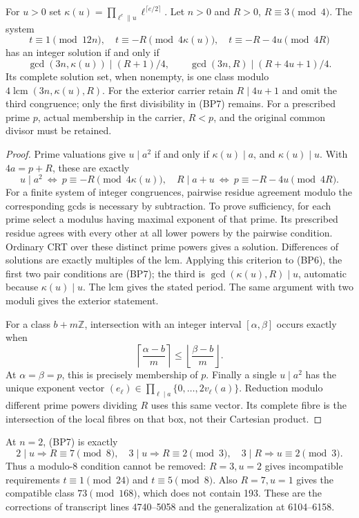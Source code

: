 \begin{theorem}
\label{thm:bp-crt}
For \(u>0\) set
\(\kappa(u)=\prod_{\ell^e\parallel u}\ell^{\lceil e/2\rceil}\).
Let \(n>0\) and \(R>0\), \(R\equiv3\pmod4\). The system
\[
 t\equiv1\pmod{12n},\quad
 t\equiv-R\pmod{4\kappa(u)},\quad
 t\equiv-R-4u\pmod{4R}
 \tag{BP6}
\]
has an integer solution if and only if
\[
 \gcd(3n,\kappa(u))\mid(R+1)/4,\qquad
 \gcd(3n,R)\mid(R+4u+1)/4.
 \tag{BP7}
\]
Its complete solution set, when nonempty, is one class modulo
\(4\operatorname{lcm}(3n,\kappa(u),R)\).
For the exterior carrier retain \(R\mid4u+1\) and omit the third
congruence; only the first divisibility in (BP7) remains.
For a prescribed prime \(p\), actual membership in the carrier,
\(R<p\), and the original common divisor must be retained.
\end{theorem}
\begin{proof}
Prime valuations give \(u\mid a^2\) if and only if
\(\kappa(u)\mid a\), and \(\kappa(u)\mid u\). With
\(4a=p+R\), these are exactly
\[
 u\mid a^2\ \Longleftrightarrow\ p\equiv-R\pmod{4\kappa(u)},
 \quad
 R\mid a+u\ \Longleftrightarrow\ p\equiv-R-4u\pmod{4R}.
\]
For a finite system of integer congruences, pairwise residue agreement
modulo the corresponding gcds is necessary by subtraction. To prove
sufficiency, for each prime select a modulus having maximal exponent
of that prime. Its prescribed residue agrees with every other at all
lower powers by the pairwise condition. Ordinary CRT over these distinct
prime powers gives a solution. Differences of solutions are exactly
multiples of the lcm. Applying this criterion to (BP6), the first two
pair conditions are (BP7); the third is
\(\gcd(\kappa(u),R)\mid u\), automatic because \(\kappa(u)\mid u\).
The lcm gives the stated period. The same argument with two moduli
gives the exterior statement.

For a class \(b+m\mathbb Z\), intersection with an integer interval
\([\alpha,\beta]\) occurs exactly when
\[
 \left\lceil\frac{\alpha-b}{m}\right\rceil
 \le\left\lfloor\frac{\beta-b}{m}\right\rfloor.
\]
At \(\alpha=\beta=p\), this is precisely membership of \(p\).
Finally a single \(u\mid a^2\) has the unique exponent vector
\((e_\ell)\in\prod_{\ell\mid a}\{0,\ldots,2v_\ell(a)\}\).
Reduction modulo different prime powers dividing \(R\) uses this same
vector. Its complete fibre is the intersection of the local fibres
on that box, not their Cartesian product.
\end{proof}

At \(n=2\), (BP7) is exactly
\[
 2\mid u\Rightarrow R\equiv7\pmod8,\quad
 3\mid u\Rightarrow R\equiv2\pmod3,\quad
 3\mid R\Rightarrow u\equiv2\pmod3.
\]
Thus a modulo-8 condition cannot be removed: \(R=3,u=2\) gives
incompatible requirements \(t\equiv1\pmod{24}\) and
\(t\equiv5\pmod8\). Also \(R=7,u=1\) gives the compatible
class \(73\pmod{168}\), which does not contain 193. These are the
corrections of transcript lines 4740--5058 and the generalization at
6104--6158.

